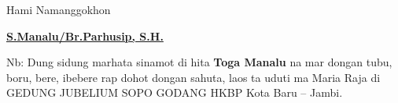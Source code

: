 \documentclass[24pt]{article}
\begin{document}
\begin{center}
{\begin{minipage}{\dimexpr\textwidth-2\fboxsep-2\fboxrule}
\begin{center}
Hami Namanggokhon

\textbf{\uline{S.Manalu/Br.Parhusip, S.H.}}


\end{center}
\small{
Nb: Dung sidung marhata sinamot di hita \textbf{Toga Manalu} na mar dongan tubu, boru, bere, ibebere rap dohot dongan sahuta, laos ta uduti ma Maria Raja di GEDUNG JUBELIUM SOPO GODANG HKBP Kota Baru -- Jambi.}

\end{minipage}
}
\end{center}
\end{document}
